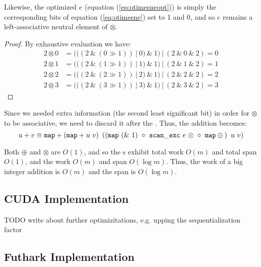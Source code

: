 Likewise, the optimized $e$ (equation (\ref{eq:otimesneopt})) is simply the
corresponding bits of equation (\ref{eq:otimesne}) set to 1 and 0, and so $e$
remains a left-associative neutral element of $\otimes$.

\begin{proof} By exhaustive evaluation we have:
\begin{align}
  \label{eq:otimesneproof}
  2 \otimes 0 &= (((2~\&~(0 \gg 1))~|~0)~\&~1)~|~(2~\&~0~\&~2) = 0 \\
  2 \otimes 1 &= (((2~\&~(1 \gg 1))~|~1)~\&~1)~|~(2~\&~1~\&~2) = 1 \\
  2 \otimes 2 &= (((2~\&~(2 \gg 1))~|~2)~\&~1)~|~(2~\&~2~\&~2) = 2 \\
  2 \otimes 3 &= (((2~\&~(3 \gg 1))~|~3)~\&~1)~|~(2~\&~3~\&~2) = 3
\end{align}
\end{proof}

Since we needed extra information (the second least significant bit) in order
for $\otimes$ to be associative, we need to discard it after the . Thus, the
addition becomes:
\begin{equation}
\label{eq:addgpu1}
u + v \equiv \mathtt{map} + \left( \mathtt{map} + u~v\right)~\left(\left(\mathtt{map}~(\&~1) ~\circ ~{\mathtt{scan\_exc}~e~\otimes}~ \circ ~ \mathtt{map} \oplus \phantom{}\right)~u~v\right)
\end{equation}

Both $\oplus$ and $\otimes$ are $O(1)$, and so the s exhibit total work
$O(m)$ and total span $O(1)$, and the  work $O(m)$ and span
$O(\log m)$. Thus, the work of a big integer addition is $O(m)$ and the span is
$O(\log m)$.


\subsection{CUDA Implementation}
\label{subsec:addcud}

{\color{red} TODO write about further optimizitations, e.g. upping the sequentialization factor}

\subsection{Futhark Implementation}
\label{subsec:addfut}

